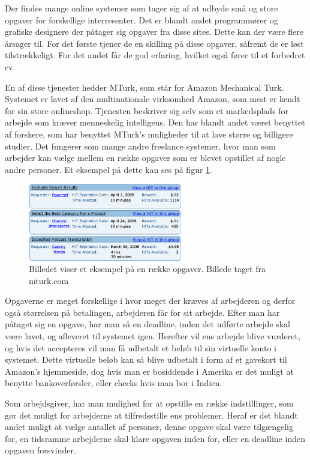 Der findes mange online systemer som tager sig af at udbyde små og store opgaver for forskellige interresenter. Det er blandt andet programmører og grafiske designere der påtager sig opgaver fra disse sites. Dette kan der være flere årsager til. For det første tjener de en skilling på disse opgaver, såfremt de er løst tilstrækkeligt. For det andet får de god erfaring, hvilket også fører til et forbedret cv.

En af disse tjenester hedder MTurk, som står for Amazon Mechanical Turk. Systemet er lavet af den multinationale virksomhed Amazon, som mest er kendt for sin store onlineshop. Tjenesten beskriver sig selv som et markedsplads for arbejde som kræver menneskelig intelligens.\cite{MTurk} Den har blandt andet været benyttet af forskere, som har benyttet MTurk's muligheder til at lave større og billigere studier.\cite{Sciencemag} Det fungerer som mange andre freelance systemer, hvor man som arbejder kan vælge mellem en række opgaver som er blevet opstillet af nogle andre personer. Et eksempel på dette kan ses på figur \ref{MTurkILL}.

\begin{figure}[htb]
\centering
\includegraphics[width=0.6\textwidth]{Billeder/MTurk.png}
\caption{Billedet viser et eksempel på en række opgaver. Billede taget fra mturk.com\cite{MTurkIMG}}
\label{MTurkILL}
\end{figure}

Opgaverne er meget forskellige i hvor meget der kræves af arbejderen og derfor også størrelsen på betalingen, arbejderen får for sit arbejde. Efter man har påtaget sig en opgave, har man så en deadline, inden det udførte arbejde skal være lavet, og afleveret til systemet igen. Herefter vil ens arbejde blive vurderet, og hvis det accepteres vil man få udbetalt et beløb til sin virtuelle konto i systemet. Dette virtuelle beløb kan så blive udbetalt i form af et gavekort til Amazon’s hjemmeside, dog hvis man er bosiddende i Amerika er det muligt at benytte bankoverførsler, eller checks hvis man bor i Indien.\cite{MTurk2}

Som arbejdsgiver, har man mulighed for at opstille en række indstillinger, som gør det muligt for arbejderne at tilfredsstille ens problemer. Heraf er det blandt andet muligt at vælge antallet af personer, denne opgave skal være tilgængelig for, en tidsramme arbejderne skal klare opgaven inden for, eller en deadline inden opgaven forsvinder.

